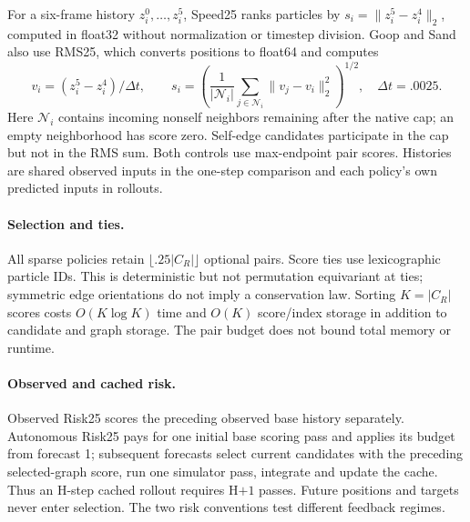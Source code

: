 For a six-frame history $z_i^0,\ldots,z_i^5$, Speed25 ranks particles by $s_i=\|z_i^5-z_i^4\|_2$, computed in float32 without normalization or timestep division. Goop and Sand also use RMS25, which converts positions to float64 and computes
\begin{equation}
 v_i=(z_i^5-z_i^4)/\Delta t,\qquad
 s_i=\left(\frac{1}{|\mathcal N_i|}\sum_{j\in\mathcal N_i}\|v_j-v_i\|_2^2\right)^{1/2},
 \quad \Delta t=.0025.
\end{equation}
Here $\mathcal N_i$ contains incoming nonself neighbors remaining after the native cap; an empty neighborhood has score zero. Self-edge candidates participate in the cap but not in the RMS sum. Both controls use max-endpoint pair scores. Histories are shared observed inputs in the one-step comparison and each policy's own predicted inputs in rollouts.

\paragraph{Selection and ties.}\label{sec:tie-symmetry}
All sparse policies retain $\lfloor .25|C_R|\rfloor$ optional pairs. Score ties use lexicographic particle IDs. This is deterministic but not permutation equivariant at ties; symmetric edge orientations do not imply a conservation law. Sorting $K=|C_R|$ scores costs $O(K\log K)$ time and $O(K)$ score/index storage in addition to candidate and graph storage. The pair budget does not bound total memory or runtime.

\paragraph{Observed and cached risk.}
Observed Risk25 scores the preceding observed base history separately. Autonomous Risk25 pays for one initial base scoring pass and applies its budget from forecast 1; subsequent forecasts select current candidates with the preceding selected-graph score, run one simulator pass, integrate and update the cache. Thus an H-step cached rollout requires H$+1$ passes. Future positions and targets never enter selection. The two risk conventions test different feedback regimes.

